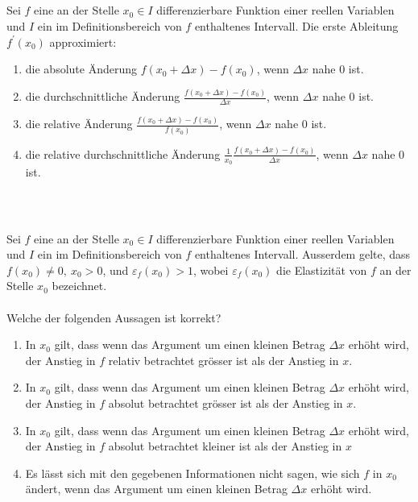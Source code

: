 \subsection*{}
Sei $f$ eine an der Stelle $x_0 \in I $ differenzierbare Funktion einer reellen Variablen und $I$ ein im Definitionsbereich von $f$ enthaltenes Intervall. Die erste Ableitung $f^\prime(x_0)$ approximiert: 
\renewcommand{\labelenumi}{(\alph{enumi})}
\begin{enumerate}
	\item 
	die absolute Änderung $f(x_0 + \Delta x) - f(x_0)$, wenn $\Delta x$ nahe $0$ ist.
 	\item
	die durchschnittliche Änderung $\frac{f(x_0 + \Delta x) - f(x_0)}{\Delta x}$, wenn $\Delta x$ nahe $0$ ist.
	\item
	die relative Änderung $\frac{f(x_0 + \Delta x) - f(x_0)}{f(x_0)}$, wenn $\Delta x$ nahe $0$ ist.
	\item
	die relative durchschnittliche Änderung $\frac{1}{x_0} \frac{f(x_0 + \Delta x) - f(x_0)}{\Delta x}$, wenn $\Delta x$ nahe $0$ ist.
\end{enumerate}
\ \\
\subsection*{}
Sei $f$ eine an der Stelle $x_0 \in I$ differenzierbare Funktion einer reellen Variablen und $I$ ein im Definitionsbereich von $f$ enthaltenes Intervall.
Ausserdem gelte, dass $f(x_0)  \neq 0, \ x_0 > 0$, und $\varepsilon_f(x_0) > 1$, wobei $\varepsilon_f(x_0)$ die Elastizität von $f$ an der Stelle $x_0$ bezeichnet.\\
\\
Welche der folgenden Aussagen ist korrekt?
\renewcommand{\labelenumi}{(\alph{enumi})}
\begin{enumerate}
	\item 
	In $x_0$ gilt, dass wenn das Argument um einen kleinen Betrag $\Delta x$ erhöht wird, der Anstieg in $f$ relativ betrachtet grösser ist als der Anstieg in $x$.
	\item
	In $x_0$ gilt, dass wenn das Argument um einen kleinen Betrag $\Delta x$ erhöht wird, der Anstieg in $f$ absolut betrachtet grösser ist als der Anstieg in $x$.
	\item
    In $x_0$ gilt, dass wenn das Argument um einen kleinen Betrag $\Delta x$ erhöht wird, der Anstieg in $f$ absolut betrachtet kleiner ist als der Anstieg in $x$
	\item
	Es lässt sich mit den gegebenen Informationen nicht sagen, wie sich $f$ in $x_0$ ändert, wenn das Argument um einen kleinen Betrag $\Delta x$ erhöht wird.
\end{enumerate}
\ \\
